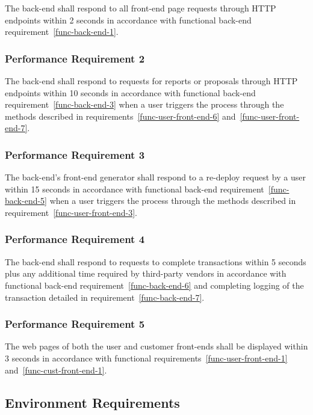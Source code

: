 \documentclass{article}
\begin{document}
The back-end shall respond to all front-end page requests through HTTP endpoints
within 2 seconds in accordance with functional back-end
requirement~\ref{func-back-end-1}.

\subsubsection{Performance Requirement 2}
\label{perf-back-end-2}

The back-end shall respond to requests for reports or proposals through HTTP
endpoints within 10 seconds in accordance with functional back-end
requirement~\ref{func-back-end-3} when a user triggers the process through the
methods described in requirements~\ref{func-user-front-end-6}
and~\ref{func-user-front-end-7}.

\subsubsection{Performance Requirement 3}
\label{perf-back-end-3}

The back-end's front-end generator shall respond to a re-deploy request by a
user within 15 seconds in accordance with functional back-end
requirement~\ref{func-back-end-5} when a user triggers the process through the
methods described in requirement~\ref{func-user-front-end-3}.

\subsubsection{Performance Requirement 4}
\label{perf-back-end-4}

The back-end shall respond to requests to complete transactions within 5 seconds
plus any additional time required by third-party vendors in accordance with
functional back-end requirement~\ref{func-back-end-6} and completing logging of
the transaction detailed in requirement~\ref{func-back-end-7}.

\subsubsection{Performance Requirement 5}
\label{perf-back-end-5}

The web pages of both the user and customer front-ends shall be displayed within
3 seconds in accordance with functional requirements~\ref{func-user-front-end-1}
and~\ref{func-cust-front-end-1}.

\pagebreak
\subsection{Environment Requirements}
\end{document}
